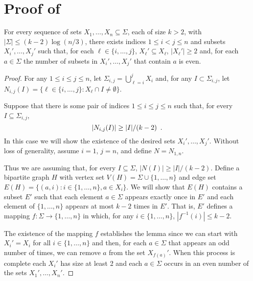 \documentclass{patmorin}
\begin{document}
\section{Proof of }

\begin{lem}
   For every sequence of sets $X_1,\ldots,X_n\subseteq\Sigma$, each of
   size $k>2$, with $|\Sigma|\le (k-2)\log(n/3)$, there exists indices
   $1\le i< j\le n$ and subsets $X_i',\ldots,X_j'$ such that, for each
   $\ell\in\{i,\ldots,j\}$,  $X_\ell'\subseteq X_\ell$, $|X_\ell'|\ge 2$
   and, for each $a\in\Sigma$ the number of subsets in $X_i',\ldots,X_j'$
   that contain $a$ is even.
\end{lem}

\begin{proof}
   For any $1\le i\le j\le n$, let $\Sigma_{i,j}=\bigcup_{\ell=i}^j
   X_i$ and, for any $I\subset\Sigma_{i,j}$, let
   $N_{i,j}(I)=\{\ell\in\{i,\ldots,j\}: X_\ell\cap I\neq\emptyset \}$.

   Suppose that there is some pair of indices $1\le i\le j\le n$ such that, for every
   $I\subseteq\Sigma_{i,j}$, 
   \begin{equation}
       |N_{i,j}(I)| \ge |I|/(k-2) \enspace . \eqlabel{hall}
   \end{equation}
   In this case
   we will show the existence of the desired sets $X_{i}',\ldots,X_{j}'$.
   Without loss of generality, assume $i=1$, $j=n$, and define $N=N_{1,n}$.

   Thus we are assuming that, for every $I\subseteq\Sigma$,  $|N(I)|\ge
   |I|/(k-2)$.  Define a bipartite graph $H$ with vertex
   set $V(H)=\Sigma\cup\{1,\ldots,n\}$ and edge set $E(H)=\{(a,i):
   i\in\{1,\ldots,n\}, a\in X_i\}$.  We will show that $E(H)$ contains a
   subset $E'$ such that each element $a\in\Sigma$ appears exactly once in
   $E'$ and each element of $\{1,\ldots,n\}$ appears at most $k-2$ times
   in $E'$.  That is, $E'$ defines a mapping $f:\Sigma\to\{1,\ldots,n\}$
   in which, for any $i\in\{1,\ldots,n\}$, $|f^{-1}(i)|\le k-2$.

   The existence of the mapping $f$ establishes the lemma since we can
   start with $X_i'=X_i$ for all $i\in\{1,\ldots,n\}$ and then, for each
   $a\in\Sigma$ that appears an odd number of times, we can remove $a$
   from the set $X_{f(a)}'$.  When this process is complete each $X_i'$
   has size at least 2 and each $a\in\Sigma$ occurs in an even number
   of the sets $X_1',\ldots,X_n'$.


\end{proof}
\end{document}
